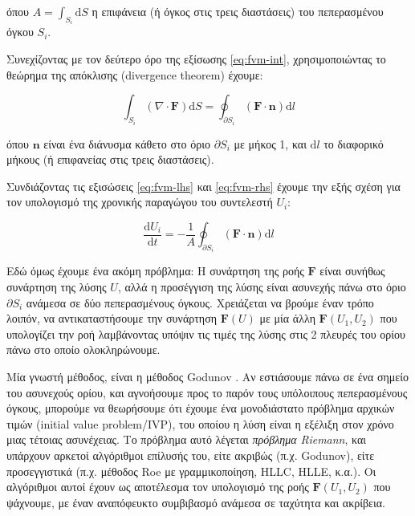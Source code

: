 όπου $A = \int_{S_i} \mathrm{d} S$ η επιφάνεια (ή όγκος στις τρεις διαστάσεις) του πεπερασμένου όγκου $S_i$.

Συνεχίζοντας με τον δεύτερο όρο της εξίσωσης \eqref{eq:fvm-int}, χρησιμοποιώντας το θεώρημα της απόκλισης (divergence theorem) έχουμε:

\begin{equation}
    \label{eq:fvm-rhs}
    \int_{S_i} \left( \nabla \cdot \mathbf{F} \right) \mathrm{d} S 
    = \oint_{\partial S_i} \left( \mathbf{F} \cdot \mathbf{n} \right) \mathrm{d} l
\end{equation}

όπου $\mathbf{n}$ είναι ένα διάνυσμα κάθετο στο όριο $\partial S_i$ με μήκος 1, και $\mathrm{d} l$ το διαφορικό μήκους (ή επιφανείας στις τρεις διαστάσεις).

Συνδιάζοντας τις εξισώσεις \eqref{eq:fvm-lhs} και \eqref{eq:fvm-rhs} έχουμε την εξής σχέση για τον υπολογισμό της χρονικής παραγώγου του συντελεστή $U_i$:

\begin{equation}
    \label{eq:fvm-update-cont}
    \frac{\mathrm{d} U_i}{\mathrm{d} t} = -\frac{1}{A} \oint_{\partial S_i} \left( \mathbf{F} \cdot \mathbf{n} \right) \mathrm{d} l
\end{equation}

Εδώ όμως έχουμε ένα ακόμη πρόβλημα: Η συνάρτηση της ροής $\mathbf{F}$ είναι συνήθως συνάρτηση της λύσης $U$, αλλά η προσέγγιση της λύσης είναι ασυνεχής πάνω στο όριο $\partial S_i$ ανάμεσα σε δύο πεπερασμένους όγκους.
Χρειάζεται να βρούμε έναν τρόπο λοιπόν, να αντικαταστήσουμε την συνάρτηση $\mathbf{F}(U)$ με μία άλλη $\mathbf{F}\left(U_1, U_2\right)$ που υπολογίζει την ροή λαμβάνοντας υπόψιν τις τιμές της λύσης στις 2 πλευρές του ορίου πάνω στο οποίο ολοκληρώνουμε.

Μία γνωστή μέθοδος, είναι η μέθοδος Godunov \cite[p. ~105]{Knight2006}. Αν εστιάσουμε πάνω σε ένα σημείο του ασυνεχούς ορίου, και αγνοήσουμε προς το παρόν τους υπόλοιπους πεπερασμένους όγκους, μπορούμε να θεωρήσουμε ότι έχουμε ένα μονοδιάστατο πρόβλημα αρχικών τιμών (initial value problem/IVP), του οποίου η λύση είναι η εξέλιξη στον χρόνο μιας τέτοιας ασυνέχειας.
Το πρόβλημα αυτό λέγεται \emph{πρόβλημα Riemann}, και υπάρχουν αρκετοί αλγόριθμοι επίλυσής του, είτε ακριβώς (π.χ. Godunov), είτε προσεγγιστικά (π.χ. μέθοδος Roe με γραμμικοποίηση, HLLC, HLLE, κ.α.).
Οι αλγόριθμοι αυτοί έχουν ως αποτέλεσμα τον υπολογισμό της ροής $\mathbf{F}\left(U_1, U_2\right)$ που ψάχνουμε, με έναν αναπόφευκτο συμβιβασμό ανάμεσα σε ταχύτητα και ακρίβεια.


